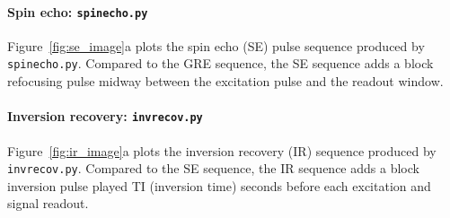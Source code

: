 \documentclass[10pt,letterpaper]{article}
\begin{document}
\paragraph{Spin echo: \texttt{spinecho.py}}
Figure~\ref{fig:se_image}a plots the spin echo (SE) pulse sequence produced by \texttt{spinecho.py}. 
Compared to the GRE sequence, the SE sequence adds a block refocusing pulse midway between
the excitation pulse and the readout window. 

\paragraph{Inversion recovery: \texttt{invrecov.py}}
Figure~\ref{fig:ir_image}a plots the inversion recovery (IR) sequence produced by \texttt{invrecov.py}.
Compared to the SE sequence, 
the IR sequence adds a block inversion pulse played TI (inversion time) seconds before
each excitation and signal readout. 
\end{document}
